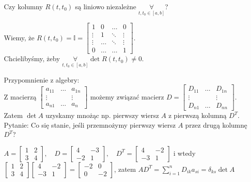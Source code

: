 \documentclass[../main.tex]{subfiles}
\begin{document}
\begin{pytanie}
Czy kolumny $R(t,t_0)$ są liniowo niezależne $\underset{t,t_0\in [a,b]}{\forall} $?
\end{pytanie}
Wiemy, że $R(t,t_0) = \mathbb{I} = \begin{bmatrix} 1&0&\ldots&0\\ \vdots&1&\ddots&\vdots \\ \vdots&\dots&\ddots&\vdots \\ 0&\dots&\dots&1 \end{bmatrix} $.\\
Chcielibyśmy, żeby $\underset{t,t_0\in[a,b] }{\forall} \det R(t,t_0) \neq 0$.

Przypomnienie z algebry:\\
Z macierzą $\begin{bmatrix} a_{11}&\ldots&a_{1n}\\ \vdots & & \vdots \\a_{n1} &\dots& a_{n} \end{bmatrix} $ możemy związać macierz $D = \begin{bmatrix} D_{11}&\ldots&D_{1n}\\ \vdots &&\vdots \\ D_{n1} & \ldots & D_{nn} \end{bmatrix} $.\\
Zatem $\det A$ uzyskamy mnożąc np. pierwszy wiersz $A$ z pierwszą kolumną $D^T$.\\
Pytanie: Co się stanie, jeśli przemnożymy pierwszy wiersz $A$ przez drugą kolumnę $D^T$?
\begin{przyklad}
    $A = \begin{bmatrix} 1&2\\3&4 \end{bmatrix},\quad D = \begin{bmatrix} 4&-3\\ -2&1 \end{bmatrix},\quad D^T = \begin{bmatrix} 4&-2\\-3&1 \end{bmatrix} $ i wtedy $\begin{bmatrix} 1&2\\3&4 \end{bmatrix} \begin{bmatrix} 4&-2\\-3&1 \end{bmatrix} = \begin{bmatrix} -2&0\\0&-2 \end{bmatrix} $, zatem $AD^T = \sum_{i=1}^n D_{ik}a_{si} = \delta_{ks}\det A$
\end{przyklad}
\end{document}

